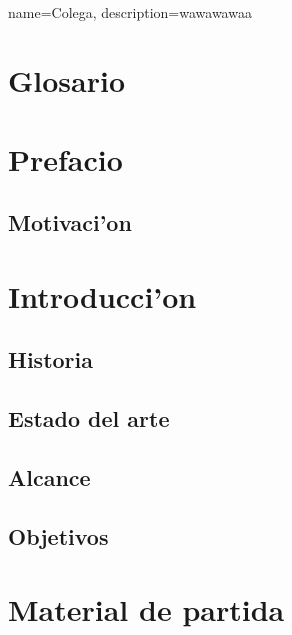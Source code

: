 \documentclass[twoside]{article}
\begin{document}
\thispagestyle{empty}
\paragraph*{}
\newpage


\tableofcontents
\setcounter{page}{1}
\newpage

\setcounter{page}{4}
\fancyhead[LE,RO]{\thepage}
{
  name=Colega,
  description={wawawawaa}
}

\makeglossaries

\section{Glosario}
\newpage

\section{Prefacio}
\subsection{Motivaci'on}
\newpage

\section{Introducci'on}
\subsection{Historia}
\subsection{Estado del arte}
\subsection{Alcance}
\subsection{Objetivos}

\newpage
\section{Material de partida }
\end{document}
